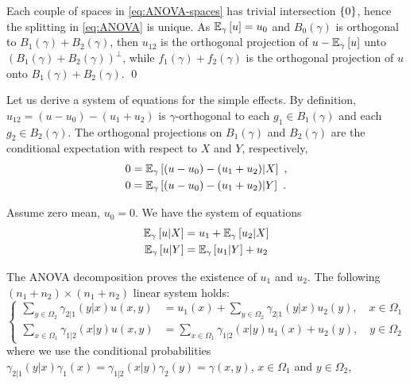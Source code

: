 \documentclass[runningheads]{llncs}
\begin{document}
Each couple of spaces in \cref{eq:ANOVA-spaces} has trivial intersection $\left\{ 0 \right\}$, hence the splitting in \cref{eq:ANOVA} is unique. As ${\operatorname{\mathbb E}}_{\gamma}\left[u\right] = u_0$ and $B_0(\gamma)$ is orthogonal to $B_1(\gamma)+B_2(\gamma)$, then $u_{12}$ is the orthogonal projection of $u - {\operatorname{\mathbb E}}_{\gamma}\left[u\right]$ unto $(B_1(\gamma)+B_2(\gamma))^\perp$, while $f_1(\gamma)+f_2(\gamma)$ is the orthogonal projection of $u$ onto $B_1(\gamma)+B_2(\gamma)$. \qed

Let us derive a system of equations for the simple effects. By definition, $u_{12} = (u - u_0) - (u_1 + u_2)$ is $\gamma$-orthogonal to each $g_1 \in B_1(\gamma)$ and each $g_2 \in B_2(\gamma)$. The orthogonal projections on $B_1(\gamma)$ and $B_2(\gamma)$ are the conditional expectation with respect to $X$ and $Y$, respectively,
%
  \begin{align*}
    0 &= {\operatorname{\mathbb E}}_{\gamma}\left[(u-u_0) - (u_1+u_2) \middle| X\right]  \ , \\
   0 &= {\operatorname{\mathbb E}}_{\gamma}\left[(u-u_0) - (u_1+u_2) \middle| Y\right] \ .
  \end{align*}

Assume zero mean, $u_0=0$. We have the system of equations
\begin{align*}
  {\operatorname{\mathbb E}}_{\gamma}\left[u \middle| X\right] &=  u_1 + {\operatorname{\mathbb E}}_{\gamma}\left[u_2 \middle| X\right] \\
  {\operatorname{\mathbb E}}_{\gamma}\left[u \middle| Y\right] &= {\operatorname{\mathbb E}}_{\gamma}\left[u_1 \middle| Y\right] + u_2
\end{align*}

The ANOVA decomposition proves the existence of $u_1$ and $u_2$.  The following $(n_1+n_2)\times(n_1+n_2)$ linear system holds:
\begin{equation*}
\begin{cases}
  \sum_{y \in \Omega_2} \gamma_{2|1}(y|x)u(x,y) &= u_1(x) + \sum_{y \in \Omega_2} \gamma_{2|1}(y|x) u_2(y) , \quad x \in \Omega_1 \\
  \sum_{x \in \Omega_1} \gamma_{1|2}(x|y)u(x,y) &= \sum_{x \in \Omega_1} \gamma_{1|2}(x|y) u_1(x)  + u_2(y) , \quad y \in \Omega_2
\end{cases}
\end{equation*}
where we use the conditional probabilities $\gamma_{2|1}(y|x) \gamma_1(x) = \gamma_{1|2}(x|y) \gamma_2(y) = \gamma(x,y)$, $x \in \Omega_1$ and $y \in \Omega_2$,
\end{document}
